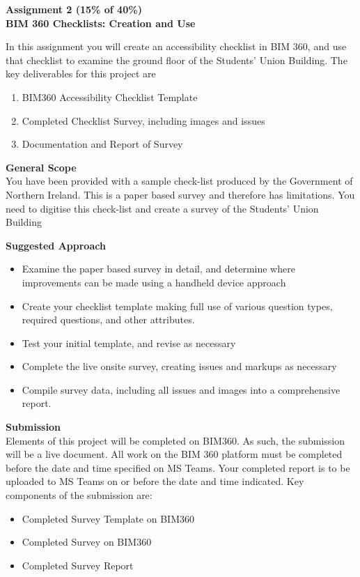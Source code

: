 
	
\begin{flushleft}
\Large\textbf{Assignment 2 (15\% of 40\%)\\
	BIM 360 Checklists: Creation and Use}\\
\end{flushleft}

In this assignment you will create an accessibility checklist in BIM 360, and use that checklist to examine the ground floor of the Students' Union Building.  The key deliverables for this project are

\begin{enumerate}
	\item BIM360 Accessibility Checklist Template
	\item Completed Checklist Survey, including images and issues
	\item Documentation and Report of Survey 
\end{enumerate}

\textbf{General Scope}\\


You have been provided with a sample check-list produced by the Government of Northern Ireland.  This is a paper based survey and therefore has limitations.  You need to digitise this check-list and create a survey of the Students' Union Building

\vspace{.5cm}

\textbf{Suggested Approach}

\begin{itemize}
	\item Examine the paper based survey in detail, and determine where improvements can be made using a handheld device approach
	\item Create your checklist template making full use of various question types, required questions, and other attributes.
	\item Test your initial template, and revise as necessary
	\item Complete the live onsite survey, creating issues and markups as necessary
	\item Compile survey data, including all issues and images into a comprehensive report.
\end{itemize}


\newpage


\textbf{Submission}\\
Elements of this project will be completed on BIM360. As such, the submission will be a live document.  All work on the BIM 360 platform must be completed before the date and time specified on MS Teams.  Your completed report is to be uploaded to MS Teams on or before the date and time indicated.  Key components of the submission are:
\begin{itemize}
	\item Completed Survey Template on BIM360
	\item Completed Survey on BIM360	
	\item Completed Survey Report
\end{itemize}




